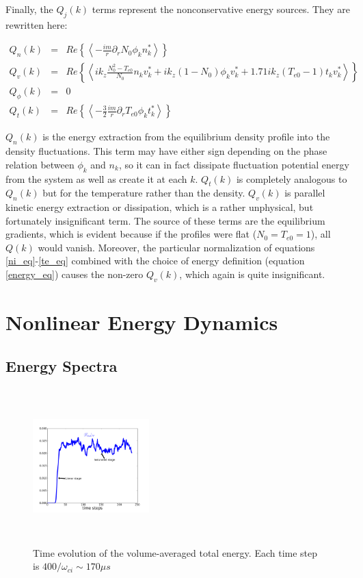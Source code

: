 \documentclass[showpacs,preprintnumbers,amsmath,amssymb,superscriptaddress]{revtex4}
\def\beqar{\begin{eqnarray}}
\def\eeqar{\end{eqnarray}}
\newcommand{\pdr}{\partial_r}
\begin{document}
Finally, the $Q_j(k)$ terms represent the nonconservative energy sources. They are rewritten here:

\beqar
Q_n(k) & = & Re \left\{ \left< -\frac{i m}{r} \pdr N_0 \phi_k n_k^*  \right> \right\}
\label{Qnk} \\
Q_v(k) & = & Re \left\{ \left<  i k_z \frac{N_0^2 - T_{e0}}{N_0} n_k v_k^* + i k_z (1 - N_0) \phi_k v_k^* + 1.71 i k_z (T_{e0} -1) t_k v_k^*  \right> \right\}
\label{Qvk} \\
Q_\phi(k) & = & 0
\label{Qpk} \\
Q_t(k) & = & Re \left\{ \left< -\frac{3}{2} \frac{i m}{r} \pdr T_{e0} \phi_k t_k^*  \right> \right\}
\label{Qtk}
\eeqar

$Q_n(k)$ is the energy extraction from the equilibrium density profile into the density fluctuations. 
This term may have either sign depending on the phase relation between $\phi_k$ and $n_k$, so it can in fact dissipate fluctuation potential energy from the system as well as create it
at each $k$. $Q_t(k)$ is completely analogous to $Q_n(k)$ but for the temperature rather than the density. 
$Q_v(k)$ is parallel kinetic energy extraction or dissipation, which is a rather unphysical, but fortunately insignificant term.
The source of these terms are the equilibrium gradients, which is evident because if the profiles
were flat ($N_0=T_{e0}=1$), all $Q(k)$ would vanish.
Moreover, the particular normalization of equations \ref{ni_eq}-\ref{te_eq} combined with the choice of energy definition (equation \ref{energy_eq}) causes the non-zero $Q_v(k)$, which again
is quite insignificant.


\section{Nonlinear Energy Dynamics}
\label{nl_en_dynamics_sec}

\subsection{Energy Spectra}

\begin{figure}
\includegraphics[width=0.40\textwidth,height=60mm]{time_evolution}
\hfil
\caption{Time evolution of the volume-averaged total energy. Each time step is $400/\omega_{ci} \sim 170 \mu s$}
\label{time_evolution}
\end{figure}
\end{document}
